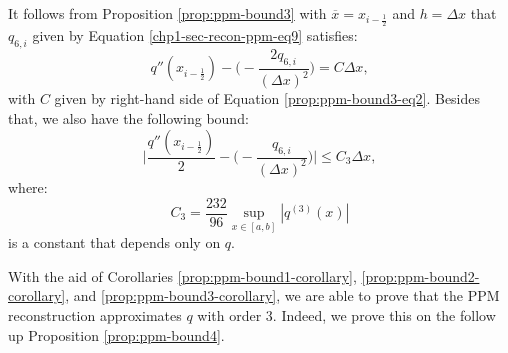 \begin{corollary}
	\label{prop:ppm-bound3-corollary}
	It follows from Proposition \ref{prop:ppm-bound3} with 
	$\overline{x} = x_{i-\frac{1}{2}}$ and $h = \Delta x$
	that $q_{6,i}$ given by Equation \eqref{chp1-sec-recon-ppm-eq9} satisfies:
	\begin{equation}
	q''(x_{i-\frac{1}{2}}) -\bigg(-\frac{2q_{6, i}}{(\Delta x)^2}\bigg) = C\Delta x,
	\end{equation}
	with $C$ given by right-hand side of Equation \eqref{prop:ppm-bound3-eq2}.
	Besides that, we also have the following bound:
	\begin{equation}
		\label{ppm-edges-bound3}
		\bigg|\frac{q''(x_{i-\frac{1}{2}})}{2} -\bigg(-\frac{q_{6, i}}{(\Delta x)^2}\bigg) \bigg|
		\leq C_3\Delta x,
	\end{equation}
	where:
	\begin{equation}
		\label{ppm-cte-bound3}
		C_3 = \frac{232}{96}\sup_{x \in [a,b]}{|q^{(3)}(x)|} 
	\end{equation}
	is a constant that depends only on $q$.
\end{corollary}

With the aid of Corollaries \ref{prop:ppm-bound1-corollary}, \ref{prop:ppm-bound2-corollary},
and  \ref{prop:ppm-bound3-corollary}, we are able to prove
that the PPM reconstruction approximates $q$ with order 3.
Indeed, we prove this on the follow up Proposition \ref{prop:ppm-bound4}.

